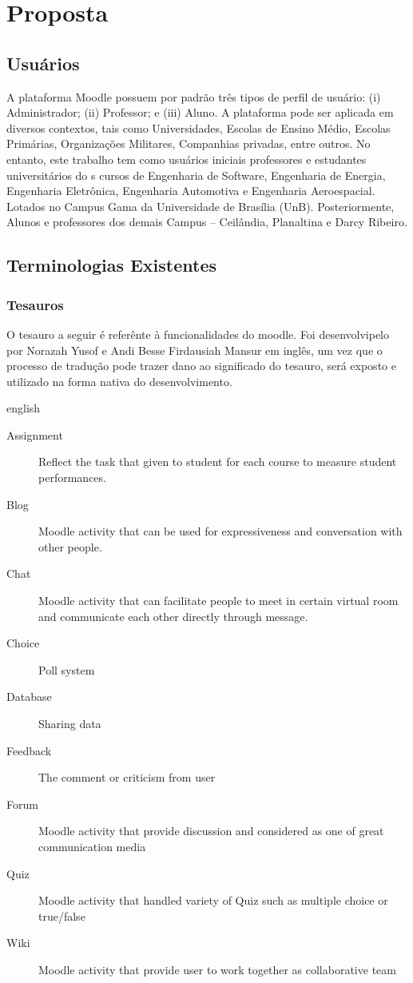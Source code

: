 \chapter{Proposta}\label{cap2}
\section{Usuários}
A plataforma Moodle possuem por padrão três tipos de perfil de usuário: (i) Administrador; (ii) Professor; e (iii) Aluno.  A plataforma pode ser aplicada em diversos contextos, tais como Universidades, Escolas de Ensino Médio, Escolas Primárias, Organizações Militares, Companhias privadas, entre outros. No entanto, este trabalho tem como usuários iniciais  professores e estudantes universitários do s cursos de Engenharia de Software, Engenharia de Energia, Engenharia Eletrônica, Engenharia Automotiva e Engenharia Aeroespacial. Lotados no Campus Gama da Universidade de Brasília (UnB). Posteriormente, Alunos e professores dos demais Campus – Ceilândia, Planaltina e Darcy Ribeiro.

\section{Terminologias Existentes}

\subsection{Tesauros}
O tesauro a seguir é referênte à funcionalidades do moodle. Foi desenvolvipelo por Norazah Yusof e Andi Besse Firdausiah Mansur em inglês, um vez que o processo de tradução pode trazer dano ao significado do tesauro, será exposto e utilizado na forma nativa do desenvolvimento.

\begin{otherlanguage*}{english}

\begin{description}
  \item[Assignment] \hfill Reflect the task that given to student for each course to measure student performances.
  \item[Blog] \hfill Moodle activity that can be used for expressiveness and conversation with other people.
  \item[Chat] \hfill Moodle activity that can facilitate people to meet in certain virtual room and communicate each other directly through message.
  \item[Choice] \hfill Poll system
  \item[Database] \hfill Sharing data
  \item[Feedback] \hfill The comment or criticism from user
  \item[Forum] \hfill Moodle activity that provide discussion and considered as one of great communication media
  \item[Quiz] \hfill Moodle activity that handled variety of Quiz such as multiple choice or true/false
  \item[Wiki] \hfill Moodle activity that provide user to work together as collaborative team

\end{description}
\end{otherlanguage*} 

